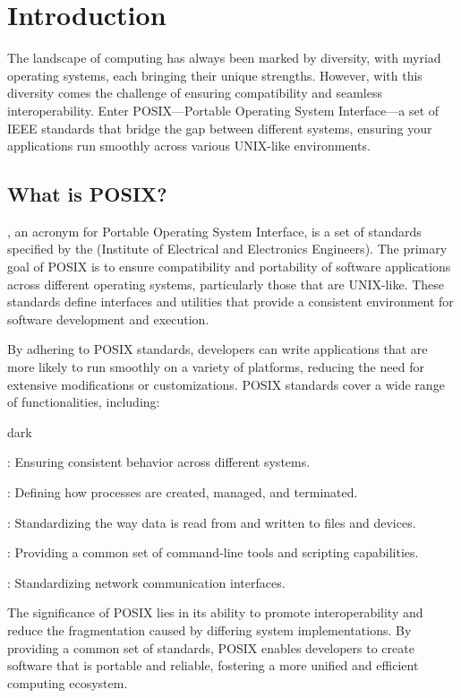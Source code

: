 \section{Introduction}
\label{sec:introduction}
The landscape of computing has always been marked by diversity, with myriad operating systems, each bringing their unique strengths. However, with this diversity comes the challenge of ensuring compatibility and seamless interoperability.
Enter POSIX—Portable Operating System Interface—a set of IEEE standards that bridge the gap between different systems, ensuring your applications run smoothly across various UNIX-like environments.

\subsection{What is POSIX?}
\label{sec:introduction:sub:what}
, an acronym for Portable Operating System Interface, is a set of standards specified by the  (Institute of Electrical and Electronics Engineers).
The primary goal of POSIX is to ensure compatibility and portability of software applications across different operating systems, particularly those that are UNIX-like. These standards define interfaces and utilities that provide a consistent environment for software development and execution.

By adhering to POSIX standards, developers can write applications that are more likely to run smoothly on a variety of platforms, reducing the need for extensive modifications or customizations.
POSIX standards cover a wide range of functionalities, including:
\bigskip
\begin{baseBoxOne}{}{dark}
    \begin{posnexItemize} 
        \item[\sA] : Ensuring consistent behavior across different systems. 
        \item[\sA] : Defining how processes are created, managed, and terminated. 
        \item[\sA] : Standardizing the way data is read from and written to files and devices. 
        \item[\sA] : Providing a common set of command-line tools and scripting capabilities. 
        \item[\sA] : Standardizing network communication interfaces.
    \end{posnexItemize}
\end{baseBoxOne}
\bigskip
The significance of POSIX lies in its ability to promote interoperability and reduce the fragmentation caused by differing system implementations.
By providing a common set of standards, POSIX enables developers to create software that is portable and reliable, fostering a more unified and efficient computing ecosystem.

